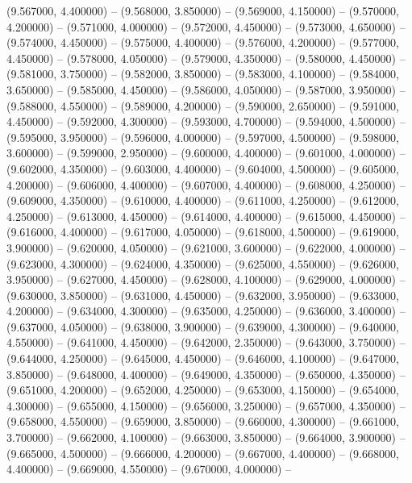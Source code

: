 (9.567000, 4.400000) -- 
(9.568000, 3.850000) -- 
(9.569000, 4.150000) -- 
(9.570000, 4.200000) -- 
(9.571000, 4.000000) -- 
(9.572000, 4.450000) -- 
(9.573000, 4.650000) -- 
(9.574000, 4.450000) -- 
(9.575000, 4.400000) -- 
(9.576000, 4.200000) -- 
(9.577000, 4.450000) -- 
(9.578000, 4.050000) -- 
(9.579000, 4.350000) -- 
(9.580000, 4.450000) -- 
(9.581000, 3.750000) -- 
(9.582000, 3.850000) -- 
(9.583000, 4.100000) -- 
(9.584000, 3.650000) -- 
(9.585000, 4.450000) -- 
(9.586000, 4.050000) -- 
(9.587000, 3.950000) -- 
(9.588000, 4.550000) -- 
(9.589000, 4.200000) -- 
(9.590000, 2.650000) -- 
(9.591000, 4.450000) -- 
(9.592000, 4.300000) -- 
(9.593000, 4.700000) -- 
(9.594000, 4.500000) -- 
(9.595000, 3.950000) -- 
(9.596000, 4.000000) -- 
(9.597000, 4.500000) -- 
(9.598000, 3.600000) -- 
(9.599000, 2.950000) -- 
(9.600000, 4.400000) -- 
(9.601000, 4.000000) -- 
(9.602000, 4.350000) -- 
(9.603000, 4.400000) -- 
(9.604000, 4.500000) -- 
(9.605000, 4.200000) -- 
(9.606000, 4.400000) -- 
(9.607000, 4.400000) -- 
(9.608000, 4.250000) -- 
(9.609000, 4.350000) -- 
(9.610000, 4.400000) -- 
(9.611000, 4.250000) -- 
(9.612000, 4.250000) -- 
(9.613000, 4.450000) -- 
(9.614000, 4.400000) -- 
(9.615000, 4.450000) -- 
(9.616000, 4.400000) -- 
(9.617000, 4.050000) -- 
(9.618000, 4.500000) -- 
(9.619000, 3.900000) -- 
(9.620000, 4.050000) -- 
(9.621000, 3.600000) -- 
(9.622000, 4.000000) -- 
(9.623000, 4.300000) -- 
(9.624000, 4.350000) -- 
(9.625000, 4.550000) -- 
(9.626000, 3.950000) -- 
(9.627000, 4.450000) -- 
(9.628000, 4.100000) -- 
(9.629000, 4.000000) -- 
(9.630000, 3.850000) -- 
(9.631000, 4.450000) -- 
(9.632000, 3.950000) -- 
(9.633000, 4.200000) -- 
(9.634000, 4.300000) -- 
(9.635000, 4.250000) -- 
(9.636000, 3.400000) -- 
(9.637000, 4.050000) -- 
(9.638000, 3.900000) -- 
(9.639000, 4.300000) -- 
(9.640000, 4.550000) -- 
(9.641000, 4.450000) -- 
(9.642000, 2.350000) -- 
(9.643000, 3.750000) -- 
(9.644000, 4.250000) -- 
(9.645000, 4.450000) -- 
(9.646000, 4.100000) -- 
(9.647000, 3.850000) -- 
(9.648000, 4.400000) -- 
(9.649000, 4.350000) -- 
(9.650000, 4.350000) -- 
(9.651000, 4.200000) -- 
(9.652000, 4.250000) -- 
(9.653000, 4.150000) -- 
(9.654000, 4.300000) -- 
(9.655000, 4.150000) -- 
(9.656000, 3.250000) -- 
(9.657000, 4.350000) -- 
(9.658000, 4.550000) -- 
(9.659000, 3.850000) -- 
(9.660000, 4.300000) -- 
(9.661000, 3.700000) -- 
(9.662000, 4.100000) -- 
(9.663000, 3.850000) -- 
(9.664000, 3.900000) -- 
(9.665000, 4.500000) -- 
(9.666000, 4.200000) -- 
(9.667000, 4.400000) -- 
(9.668000, 4.400000) -- 
(9.669000, 4.550000) -- 
(9.670000, 4.000000) -- 
